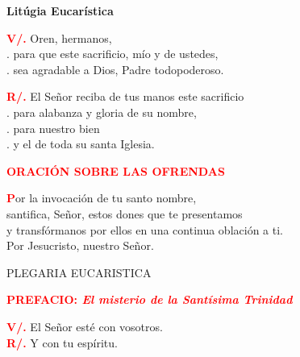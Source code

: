 \documentclass[12pt, letterpaper, spanish]{report}
\begin{document}
\newpage

\begin{center}
\Huge {\bfseries Lit\'ugia Eucar\'istica}
\end{center}

\Large \hspace{-0.9cm} {\bfseries \textcolor{red}{V/.}} \hspace{0.5cm} Oren, hermanos, \\
.\hspace{1.5cm} para que este sacrificio, m\'io y de ustedes, \\
.\hspace{1.5cm} sea agradable a Dios, Padre todopoderoso. \newline

\Large \hspace{-0.9cm} {\bfseries \textcolor{red}{R/.}} \hspace{0.5cm} El Se\~nor reciba de tus manos este sacrificio \\
.\hspace{1.5cm} para alabanza y gloria de su nombre, \\
.\hspace{1.5cm} para nuestro bien \\
.\hspace{1.5cm} y el de toda su santa Iglesia. \newline

\Large {\bfseries \textcolor{red}{ORACI\'ON SOBRE LAS OFRENDAS}} \newline

\Large \lettrine{\bfseries \textcolor{red}{P}}{}or la invocaci\'on de tu santo nombre, \\
santifica, Se\~nor, estos dones que te presentamos \\
y transf\'ormanos por ellos en una continua oblaci\'on a ti. \\
Por Jesucristo, nuestro Se\~nor. \newline

\begin{center}
\Large PLEGARIA EUCARISTICA
\end{center}

\Large {\bfseries \textcolor{red}{PREFACIO: \em \large El misterio de la Sant\'isima Trinidad}} \newline

\Large \hspace{-0.9cm} {\bfseries \textcolor{red}{V/.}} \hspace{0.5cm} El Se\~nor est\'e con vosotros. \\
\Large \hspace{-0.9cm} {\bfseries \textcolor{red}{R/.}} \hspace{0.5cm} Y con tu esp\'iritu. \\
\end{document}
